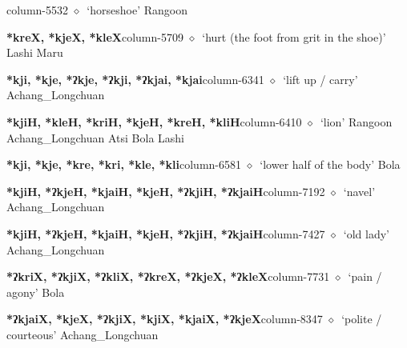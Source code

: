   \item {\footnotesize \textbf{}}{\tiny column-5532}
         $\diamond$~`horseshoe'
         Rangoon 
  \item {\footnotesize \textbf{*kreX, *kjeX, *kleX}}{\tiny column-5709}
         $\diamond$~`hurt (the foot from grit in the shoe)'
         Lashi 
\hspace{1ex}
         Maru 
  \item {\footnotesize \textbf{*kji, *kje, *ʔkje, *ʔkji, *ʔkjai, *kjai}}{\tiny column-6341}
         $\diamond$~`lift up / carry'
         Achang\_Longchuan 
  \item {\footnotesize \textbf{*kjiH, *kleH, *kriH, *kjeH, *kreH, *kliH}}{\tiny column-6410}
         $\diamond$~`lion'
         Rangoon 
\hspace{1ex}
         Achang\_Longchuan 
\hspace{1ex}
         Atsi 
\hspace{1ex}
         Bola 
\hspace{1ex}
         Lashi 
  \item {\footnotesize \textbf{*kji, *kje, *kre, *kri, *kle, *kli}}{\tiny column-6581}
         $\diamond$~`lower half of the body'
         Bola 
  \item {\footnotesize \textbf{*kjiH, *ʔkjeH, *kjaiH, *kjeH, *ʔkjiH, *ʔkjaiH}}{\tiny column-7192}
         $\diamond$~`navel'
         Achang\_Longchuan 
  \item {\footnotesize \textbf{*kjiH, *ʔkjeH, *kjaiH, *kjeH, *ʔkjiH, *ʔkjaiH}}{\tiny column-7427}
         $\diamond$~`old lady'
         Achang\_Longchuan 
  \item {\footnotesize \textbf{*ʔkriX, *ʔkjiX, *ʔkliX, *ʔkreX, *ʔkjeX, *ʔkleX}}{\tiny column-7731}
         $\diamond$~`pain / agony'
         Bola 
  \item {\footnotesize \textbf{*ʔkjaiX, *kjeX, *ʔkjiX, *kjiX, *kjaiX, *ʔkjeX}}{\tiny column-8347}
         $\diamond$~`polite / courteous'
         Achang\_Longchuan 

